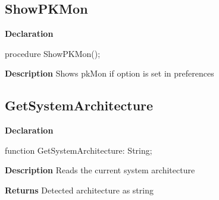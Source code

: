 \documentclass{report}
\newif\ifpdf
\begin{document}
\subsection*{ShowPKMon}
\fi
\label{licommon-ShowPKMon}
\begin{list}{}{
\setlength{\itemindent}{0cm}
\setlength{\listparindent}{0cm}
\setlength{\leftmargin}{\evensidemargin}
\addtolength{\leftmargin}{\tmplength}
\settowidth{\labelsep}{X}
\addtolength{\leftmargin}{\labelsep}
\setlength{\labelwidth}{\tmplength}
}
\item[\textbf{Declaration}\hfill]
\ifpdf
\begin{flushleft}
\fi
\begin{ttfamily}
procedure ShowPKMon();\end{ttfamily}

\ifpdf
\end{flushleft}
\fi

\par
\item[\textbf{Description}]
Shows pkMon if option is set in preferences

\end{list}
\ifpdf
\subsection*{\large{\textbf{GetSystemArchitecture}}\normalsize\hspace{1ex}\hrulefill}
\else
\subsection*{GetSystemArchitecture}
\fi
\label{licommon-GetSystemArchitecture}
\begin{list}{}{
\setlength{\itemindent}{0cm}
\setlength{\listparindent}{0cm}
\setlength{\leftmargin}{\evensidemargin}
\addtolength{\leftmargin}{\tmplength}
\settowidth{\labelsep}{X}
\addtolength{\leftmargin}{\labelsep}
\setlength{\labelwidth}{\tmplength}
}
\item[\textbf{Declaration}\hfill]
\ifpdf
\begin{flushleft}
\fi
\begin{ttfamily}
function GetSystemArchitecture: String;\end{ttfamily}

\ifpdf
\end{flushleft}
\fi

\par
\item[\textbf{Description}]
Reads the current system architecture \par
\item[\textbf{Returns}]Detected architecture as string


\end{list}
\ifpdf
\end{document}
